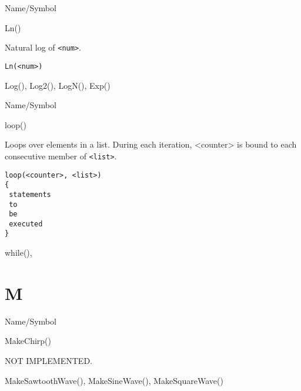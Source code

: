 \rl


\begin{desc}{Name/Symbol}
\item[Name/Symbol]	Ln()

\item[Description]	Natural log of \verb+<num>+.

\item[Usage]		
\begin{verbatim}
Ln(<num>)
\end{verbatim}

\item[Example]	

\item[See Also]	Log(), Log2(), LogN(), Exp()     
\end{desc}

\rl


\begin{desc}{Name/Symbol}
\item[Name/Symbol]	loop()

\item[Description]	Loops over elements in a list.  During each iteration, <counter> is bound to each consecutive member of \verb+<list>+.

\item[Usage]		
\begin{verbatim}
loop(<counter>, <list>)
{
 statements
 to
 be	   
 executed
}
\end{verbatim}

\item[Example]	

\item[See Also]	while(), {}
\end{desc}

\rl

\section{M}
\rl


\begin{desc}{Name/Symbol}
\item[Name/Symbol]	MakeChirp()  

\item[Description]	NOT IMPLEMENTED.

\item[Usage]		

\item[Example]	

\item[See Also]	MakeSawtoothWave(), MakeSineWave(), MakeSquareWave()
\end{desc}


